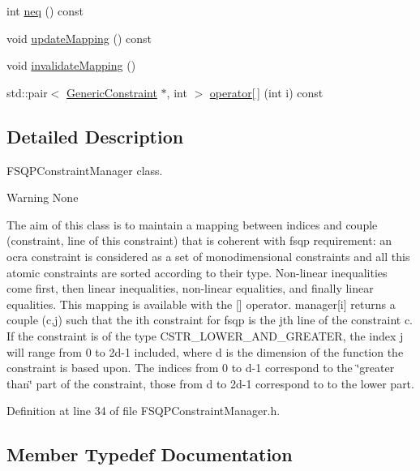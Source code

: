 \begin{DoxyCompactItemize}
\item 
int \hyperlink{classocra_1_1FSQPConstraintManager_afa65a38beba8395f74c0f417f5b2ce18}{neq} () const 
\item 
void \hyperlink{classocra_1_1FSQPConstraintManager_a839a2083ccf3e425ec67ccaa7e24d076}{update\+Mapping} () const 
\item 
void \hyperlink{classocra_1_1FSQPConstraintManager_a54f055c7be78852480dbd3f5ba66656e}{invalidate\+Mapping} ()
\item 
std\+::pair$<$ \hyperlink{namespaceocra_af10341108ce661566aad00908668e2b1}{Generic\+Constraint} $\ast$, int $>$ \hyperlink{classocra_1_1FSQPConstraintManager_ab4289ebd76c686620d707b44ee2be0ff}{operator\mbox{[}$\,$\mbox{]}} (int i) const 
\end{DoxyCompactItemize}


\subsection{Detailed Description}
F\+S\+Q\+P\+Constraint\+Manager class. 

\begin{DoxyWarning}{Warning}
None
\end{DoxyWarning}
The aim of this class is to maintain a mapping between indices and couple (constraint, line of this constraint) that is coherent with fsqp requirement\+: an ocra constraint is considered as a set of monodimensional constraints and all this \textquotesingle{}atomic\textquotesingle{} constraints are sorted according to their type. Non-\/linear inequalities come first, then linear inequalities, non-\/linear equalities, and finally linear equalities. This mapping is available with the \mbox{[}\mbox{]} operator. manager\mbox{[}i\mbox{]} returns a couple (c,j) such that the ith constraint for fsqp is the jth line of the constraint c. If the constraint is of the type C\+S\+T\+R\+\_\+\+L\+O\+W\+E\+R\+\_\+\+A\+N\+D\+\_\+\+G\+R\+E\+A\+T\+ER, the index j will range from 0 to 2d-\/1 included, where d is the dimension of the function the constraint is based upon. The indices from 0 to d-\/1 correspond to the \char`\"{}greater than\char`\"{} part of the constraint, those from d to 2d-\/1 correspond to to the lower part. 

Definition at line 34 of file F\+S\+Q\+P\+Constraint\+Manager.\+h.



\subsection{Member Typedef Documentation}
